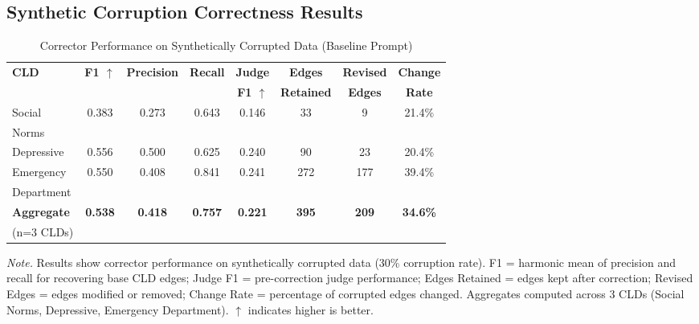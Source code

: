 \documentclass{article}
\begin{document}
\subsection{Synthetic Corruption Correctness Results}

\begin{table}[htbp]
\centering
\caption{Corrector Performance on Synthetically Corrupted Data (Baseline Prompt)}
\label{tab:rq1b_synthetic_correctness}
\begin{threeparttable}
\begin{tabular}{lccccccc}
\toprule
\textbf{CLD} & \textbf{F1 $\uparrow$} & \textbf{Precision} & \textbf{Recall} & \textbf{Judge} & \textbf{Edges} & \textbf{Revised} & \textbf{Change} \\
 & & & & \textbf{F1 $\uparrow$} & \textbf{Retained} & \textbf{Edges} & \textbf{Rate} \\
\midrule
Social       & 0.383 & 0.273 & 0.643 & 0.146 & 33 & 9 & 21.4\% \\
Norms        &       &       &       &       &    &   &        \\
\midrule
Depressive   & 0.556 & 0.500 & 0.625 & 0.240 & 90 & 23 & 20.4\% \\
\midrule
Emergency    & 0.550 & 0.408 & 0.841 & 0.241 & 272 & 177 & 39.4\% \\
Department   &       &       &       &       &     &     &        \\
\midrule
\textbf{Aggregate} & \textbf{0.538} & \textbf{0.418} & \textbf{0.757} & \textbf{0.221} & \textbf{395} & \textbf{209} & \textbf{34.6\%} \\
(n=3 CLDs)   &       &       &       &       &     &     &        \\
\bottomrule
\end{tabular}
\begin{tablenotes}
\small
\item \textit{Note.} Results show corrector performance on synthetically corrupted data (30\% corruption rate). 
F1 = harmonic mean of precision and recall for recovering base CLD edges; Judge F1 = pre-correction judge performance; 
Edges Retained = edges kept after correction; Revised Edges = edges modified or removed; 
Change Rate = percentage of corrupted edges changed. 
Aggregates computed across 3 CLDs (Social Norms, Depressive, Emergency Department). $\uparrow$ indicates higher is better.
\end{tablenotes}
\end{threeparttable}
\end{table}
\end{document}
